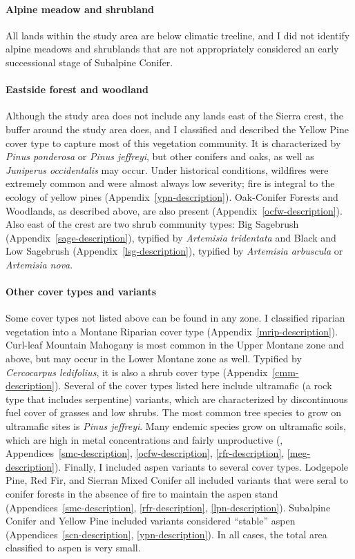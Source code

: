 \paragraph*{Alpine meadow and shrubland} All lands within the study area are below climatic treeline, and I did not identify alpine meadows and shrublands that are not appropriately considered an early successional stage of Subalpine Conifer.


\paragraph*{Eastside forest and woodland} Although the study area does not include any lands east of the Sierra crest, the buffer around the study area does, and I classified and described the Yellow Pine cover type to capture most of this vegetation community. It is characterized by \emph{Pinus ponderosa} or \emph{Pinus jeffreyi}, but other conifers and oaks, as well as \emph{Juniperus occidentalis} may occur. Under historical conditions, wildfires were extremely common and were almost always low severity; fire is integral to the ecology of yellow pines (Appendix~\ref{ypn-description}). 
%
Oak-Conifer Forests and Woodlands, as described above, are also present (Appendix~\ref{ocfw-description}). 
%
Also east of the crest are two shrub community types: Big Sagebrush (Appendix~\ref{sage-description}), typified by \emph{Artemisia tridentata} and Black and Low Sagebrush (Appendix~\ref{lsg-description}), typified by \emph{Artemisia arbuscula} or \emph{Artemisia nova}. 


\paragraph*{Other cover types and variants} Some cover types not listed above can be found in any zone. I classified riparian vegetation into a Montane Riparian cover type (Appendix~\ref{mrip-description}). 
%
Curl-leaf Mountain Mahogany is most common in the Upper Montane zone and above, but may occur in the Lower Montane zone as well. Typified by \emph{Cercocarpus ledifolius}, it is also a shrub cover type (Appendix~\ref{cmm-description}). 
%
Several of the cover types listed here include ultramafic (a rock type that includes serpentine) variants, which are characterized by discontinuous fuel cover of grasses and low shrubs. The most common tree species to grow on ultramafic sites is \emph{Pinus jeffreyi}. Many endemic species grow on ultramafic soils, which are high in metal concentrations and fairly unproductive (\citealt{OGeen2007}, Appendices~\ref{smc-description}, \ref{ocfw-description}, \ref{rfr-description}, \ref{meg-description}).
%
Finally, I included aspen variants to several cover types. Lodgepole Pine, Red Fir, and Sierran Mixed Conifer all included variants that were seral to conifer forests in the absence of fire to maintain the aspen stand (Appendices~\ref{smc-description}, \ref{rfr-description}, \ref{lpn-description}). Subalpine Conifer and Yellow Pine included variants considered ``stable'' aspen (Appendices~\ref{scn-description}, \ref{ypn-description}). In all cases, the total area classified to aspen is very small. 

